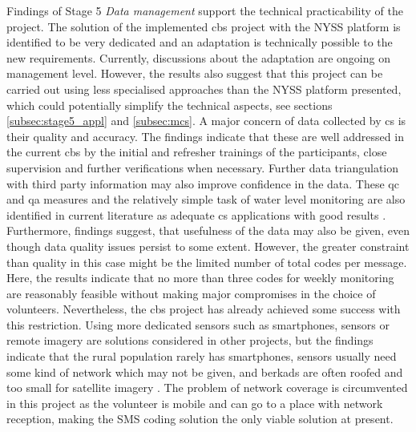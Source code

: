 Findings of Stage 5 \textit{Data management} support the technical practicability of the project. The solution of the implemented \acrshort{cbs} project with the NYSS platform is identified to be very dedicated and an adaptation is technically possible to the new requirements. Currently, discussions about the adaptation are ongoing on management level. However, the results also suggest that this project can be carried out using less specialised approaches than the NYSS platform presented, which could potentially simplify the technical aspects, see sections \ref{subsec:stage5_appl} and \ref{subsec:mcs}.\newline
A major concern of data collected by \acrshort{cs} is their quality and accuracy. The findings indicate that these are well addressed in the current \acrshort{cbs} by the initial and refresher trainings of the participants, close supervision and further verifications when necessary. Further data triangulation with third party information may also improve confidence in the data. These \acrshort{qc} and \acrshort{qa} measures and the relatively simple task of water level monitoring are also identified in current literature as adequate \acrshort{cs} applications with good results \autocite{albusAccuracyLongtermVolunteer2020,baalbakiCitizenScienceLebanon2019,fraislCitizenScienceEnvironmental2022}. Furthermore, \autocite{aceves-buenoCitizenScienceApproach2015} findings suggest, that usefulness of the data may also be given, even though data quality issues persist to some extent. However, the greater constraint than quality in this case might be the limited number of total codes per message. Here, the results indicate that no more than three codes for weekly monitoring are reasonably feasible without making major compromises in the choice of volunteers. Nevertheless, the \acrshort{cbs} project has already achieved some success with this restriction.\newline
Using more dedicated sensors such as smartphones, sensors or remote imagery are solutions considered in other projects, but the findings indicate that the rural population rarely has smartphones, sensors usually need some kind of network which may not be given, and berkads are often roofed and too small for satellite imagery \autocite{bartramGlobalMonitoringWater2014,klemasUsingRemoteSensing2015,maoMovingTechnologySociotechnical2020,masindeITIKIMobileBased2019,mcneilLandscapeParticipatorySurveillance2022a,senayEstablishingOperationalWaterhole2013,thomsonRemoteMonitoringRural2021}. The problem of network coverage is circumvented in this project as the volunteer is mobile and can go to a place with network reception, making the SMS coding solution the only viable solution at present.

